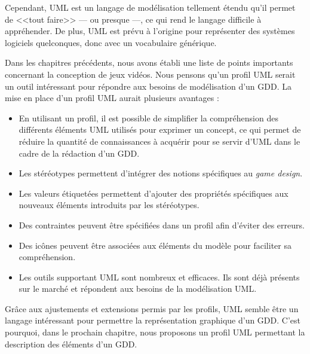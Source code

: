 


Cependant, UML est un langage de modélisation tellement étendu qu'il permet de <<tout faire>> --- ou presque ---, ce qui rend le langage difficile à appréhender.
De plus, UML est prévu à l'origine pour représenter des systèmes logiciels quelconques, donc avec un vocabulaire générique.


Dans les chapitres précédents, nous avons établi une liste de points importants concernant la conception de jeux vidéos.
Nous pensons qu'un profil UML serait un outil int\'eressant pour répondre aux besoins de modélisation d'un GDD.
La mise en place d'un profil UML aurait plusieurs avantages :
\begin{itemize}
    \item En utilisant un profil, il est possible de simplifier la compréhension des différents éléments UML utilisés pour exprimer un concept, ce qui permet de réduire la quantité de connaissances à acquérir pour se servir d'UML dans le cadre de la rédaction d'un GDD.

    \item Les stéréotypes permettent d'intégrer des notions spécifiques au \emph{game design}.

    \item Les valeurs \'etiquet\'ees permettent d'ajouter des propriétés spécifiques aux nouveaux éléments introduits par les st\'er\'eotypes.

    \item Des contraintes peuvent être sp\'ecifi\'ees dans un profil afin d'éviter des erreurs.

    \item Des ic\^ones peuvent être associ\'ees aux éléments du modèle pour faciliter sa compréhension.

    \item Les outils supportant UML sont nombreux et efficaces. Ils sont déjà présents sur le marché et répondent aux besoins de la modélisation UML.
\end{itemize}



Grâce aux ajustements et extensions permis par les profils, UML semble être un langage int\'eressant pour permettre la représentation graphique d'un GDD.
C'est pourquoi, dans le prochain chapitre, nous proposons un profil UML permettant la description des éléments d'un GDD.
